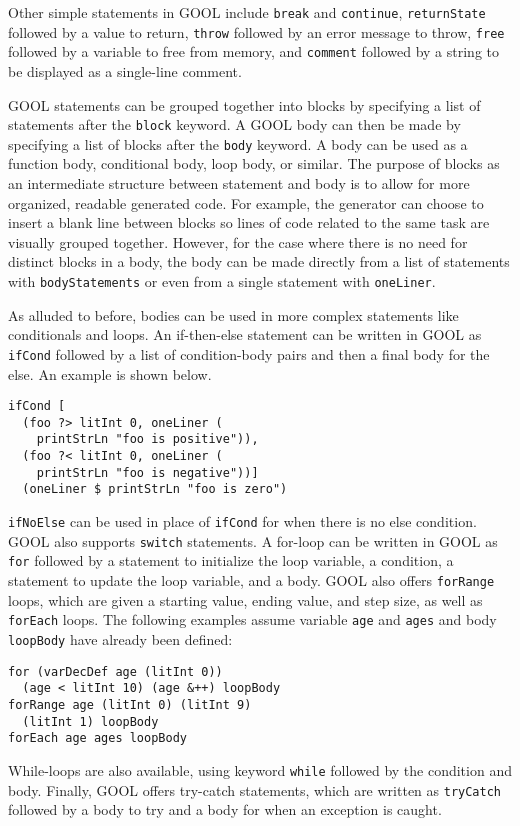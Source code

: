 \documentclass[sigplan,review,anonymous]{acmart}
\begin{document}
Other simple statements in GOOL include \verb|break| and \verb|continue|, 
\verb|returnState| followed by a value to return, \verb|throw| followed by an 
error message to throw, \verb|free| followed by a variable to free from
memory, and \verb|comment| followed by a string to be displayed as a 
single-line comment.

GOOL statements can be grouped together into blocks by specifying a list of 
statements after the \verb|block| keyword. A GOOL body can then be made by 
specifying a list of blocks after the \verb|body| keyword. A body can be used 
as a function body, conditional body, loop body, or similar. The purpose of 
blocks as an intermediate structure between statement and body is to allow for 
more organized, readable generated code. For example, the generator can choose 
to insert a blank line between blocks so lines of code related to the same task 
are visually grouped together. However, for the case where there is no need for 
distinct blocks in a body, the body can be made directly from a list of 
statements with \verb|bodyStatements| or even from a single statement with 
\verb|oneLiner|. 
 
As alluded to before, bodies can be used in more complex statements like 
conditionals and loops. An if-then-else statement can be written in GOOL as 
\verb|ifCond| followed by a list of condition-body pairs and then a final body 
for the else. An example is shown below.
\begin{lstlisting}
ifCond [
  (foo ?> litInt 0, oneLiner (
    printStrLn "foo is positive")),
  (foo ?< litInt 0, oneLiner (
    printStrLn "foo is negative"))] 
  (oneLiner $ printStrLn "foo is zero")
\end{lstlisting}
\verb|ifNoElse| can be used in place of \verb|ifCond| for when there is no else 
condition. GOOL also supports \verb|switch| statements. A for-loop can be 
written in GOOL as \verb|for| followed by a statement to 
initialize the loop variable, a condition, a statement to update the loop 
variable, and a body. GOOL also offers \verb|forRange| loops, which are given a 
starting value, ending value, and step size, as well as \verb|forEach| loops. 
The following examples assume variable \verb|age| and \verb|ages| and body 
\verb|loopBody| have already been defined:
\begin{lstlisting}
for (varDecDef age (litInt 0)) 
  (age < litInt 10) (age &++) loopBody
forRange age (litInt 0) (litInt 9) 
  (litInt 1) loopBody
forEach age ages loopBody
\end{lstlisting}
While-loops are also available, using keyword \verb|while| followed by the 
condition and body. Finally, GOOL offers try-catch statements, which are 
written as \verb|tryCatch| followed by a body to try and a body for when an 
exception is caught.
\end{document}
